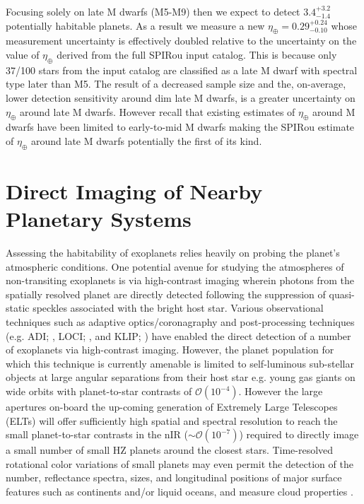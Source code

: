 Focusing solely on late M dwarfs (M5-M9) then we expect to detect
$3.4^{+3.2}_{-1.4}$ potentially habitable planets. As a result we measure a new 
$\eta_{\oplus}=0.29^{+0.24}_{-0.10}$ whose measurement uncertainty is effectively doubled 
relative to the uncertainty on the value of $\eta_{\oplus}$ derived from the full SPIRou input
catalog. This is because only 37/100 stars from the input catalog are
classified as a late M dwarf with spectral type later than M5. The result of a decreased sample size and the,
on-average, lower detection sensitivity around dim late M dwarfs, is a greater uncertainty
on $\eta_{\oplus}$ around late M dwarfs. However recall that existing estimates of $\eta_{\oplus}$
around M dwarfs have been limited to early-to-mid M dwarfs making the SPIRou estimate of
$\eta_{\oplus}$ around late M dwarfs potentially the first of its kind.


\section{Direct Imaging of Nearby Planetary Systems} \label{BSsect:imaging}
Assessing the habitability of exoplanets relies heavily on probing the planet's atmospheric
conditions. One potential avenue for studying the atmospheres of non-transiting exoplanets is
via high-contrast imaging
wherein photons from the spatially resolved planet are directly detected following the suppression
of quasi-static speckles associated with the bright host star. Various observational techniques such as
adaptive optics/coronagraphy and post-processing techniques (e.g. ADI; \citealt{marois06},
LOCI; \citealt{lafreniere07a}, and KLIP; \citealt{soummer12})
have enabled the direct detection of a number of exoplanets via high-contrast imaging.
However, the planet population for which this technique is currently amenable is limited to self-luminous
sub-stellar objects at large angular separations from their host star e.g. young gas giants on wide orbits with
planet-to-star contrasts of $\mathcal{O}(10^{-4})$.
However the large apertures on-board the up-coming generation of Extremely Large Telescopes (ELTs)
will offer sufficiently high spatial and spectral resolution to reach
the small planet-to-star contrasts in the nIR ($\sim \mathcal{O}(10^{-7})$) required to directly image
a small number of small HZ planets around the closest stars.
Time-resolved rotational color variations of small planets may even permit 
the detection of the number, reflectance spectra, sizes, and longitudinal positions of major surface
features such as continents and/or liquid oceans, and measure cloud properties
\citep{ford01,fujii10,fujii11,cowan09,cowan13}.

